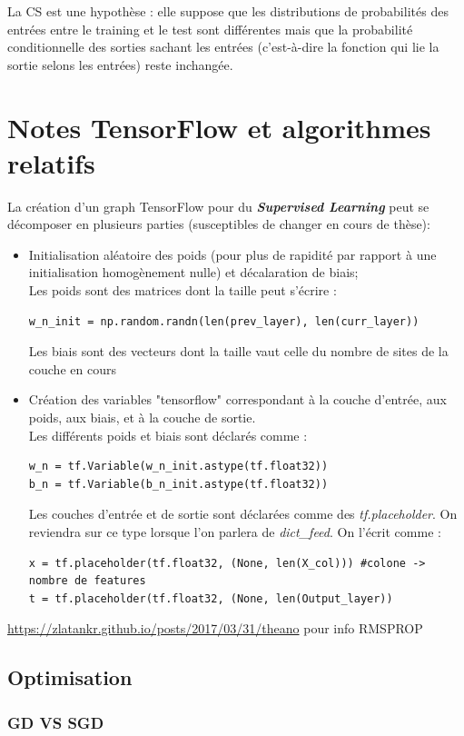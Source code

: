 \documentclass[a4paper,12pt]{report}
\newcommand\bk{\color{black}}
\newcommand\brick{\color{brick}}
\newcommand\navy{\color{navy}}
\newcommand{\cad}{c'est-à-dire}
\numberwithin{equation}{section} %
\begin{document}
\noindent La CS est une hypothèse : elle suppose que les distributions de probabilités des entrées entre le training et le test sont différentes mais que la probabilité conditionnelle des sorties sachant les entrées (\cad $ $ la fonction qui lie la sortie selons les entrées) reste inchangée.

\newpage

\navy \chapter{Notes TensorFlow et algorithmes relatifs} \bk
La création d'un graph TensorFlow pour du \textit{\textbf{Supervised Learning}} peut se décomposer en plusieurs parties (susceptibles de changer en cours de thèse):
\begin{itemize}
\item[\textit{a) }] Initialisation aléatoire des poids (pour plus de rapidité par rapport à une initialisation homogènement nulle) et décalaration de biais; \\
Les poids sont des matrices dont la taille peut s'écrire : 
\begin{lstlisting}
w_n_init = np.random.randn(len(prev_layer), len(curr_layer))
\end{lstlisting}
Les biais sont des vecteurs dont la taille vaut celle du nombre de sites de la couche en cours
\item[\textit{b) }] Création des variables "tensorflow" correspondant à la couche d'entrée, aux poids, aux biais, et à la couche de sortie.\\
Les différents poids et biais sont déclarés comme :
\begin{lstlisting}
w_n = tf.Variable(w_n_init.astype(tf.float32))
b_n = tf.Variable(b_n_init.astype(tf.float32))
\end{lstlisting}
Les couches d'entrée et de sortie sont déclarées comme des \textit{tf.placeholder}. On reviendra sur ce type lorsque l'on parlera de \textit{dict\_feed}. On l'écrit comme :
\begin{lstlisting}
x = tf.placeholder(tf.float32, (None, len(X_col))) #colone -> nombre de features
t = tf.placeholder(tf.float32, (None, len(Output_layer))
\end{lstlisting} 
\end{itemize}

\url{https://zlatankr.github.io/posts/2017/03/31/theano} pour info RMSPROP
\pagebreak 
\section{Optimisation}
\brick \subsection{GD VS SGD} \bk
\end{document}
